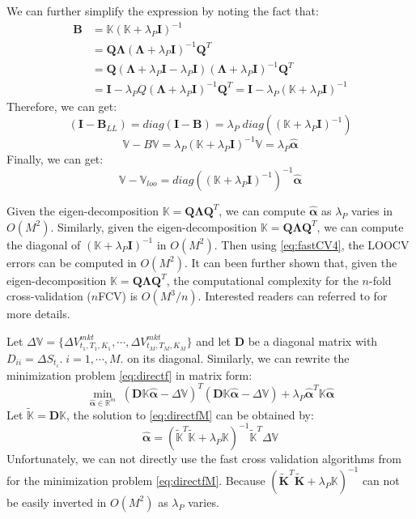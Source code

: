 \documentclass[letterpaper,12pt,titlepage,oneside,final]{book}
\numberwithin{equation}{section}
\theoremstyle{definition}
\newcommand{\Real}{\mathbb{R}}
\newcommand{\valpha}{\pmb{\widehat{\alpha}}}
\newcommand{\vK}{\mathbb{K}}
\newcommand{\Vmkt}{V^{mkt}}
\newcommand{\vecVmkt}{\mathbb{V}}
\begin{document}
We can further simplify the expression by noting the fact that:
\[\begin{split}
\pmb{B}&=\vK (\vK+\lambda_P \pmb{I})^{-1} \\
       &=\pmb{Q}\pmb{\Lambda}(\pmb{\Lambda}+\lambda_P \pmb{I})^{-1} \pmb{Q}^T\\
       &=\pmb{Q}(\pmb{\Lambda}+\lambda_P \pmb{I}-\lambda_P \pmb{I})(\pmb{\Lambda}+\lambda_P \pmb{I})^{-1} \pmb{Q}^T\\
       &= \pmb{I}-\lambda_P Q (\pmb{\Lambda}+\lambda_P \pmb{I})^{-1} \pmb{Q}^T=\pmb{I} -\lambda_P  (\vK+\lambda_P \pmb{I})^{-1}
  \end{split}
\]
Therefore, we can get:
\[
(\pmb{I}-\pmb{B}_{LL})=diag(\pmb{I}-\pmb{B})=\lambda_P \; diag((\vK+\lambda_P \pmb{I})^{-1})
\]
\[
\vecVmkt-B\vecVmkt=\lambda_P (\vK+\lambda_P \pmb{I})^{-1} \vecVmkt =\lambda_P \valpha
\]
Finally, we can get:
\begin{equation}  \label{eq:fastCV4}
\vecVmkt-\vecVmkt_{loo}=diag((\vK+\lambda_P \pmb{I})^{-1})^{-1} \valpha
\end{equation}

Given the eigen-decomposition $\vK=\pmb{Q} \pmb{\Lambda} \pmb{Q}^T$, we can compute  $\valpha$ as $\lambda_P$ varies in $O(M^2)$. Similarly, given the eigen-decomposition $\vK=\pmb{Q} \pmb{\Lambda} \pmb{Q}^T$, we can compute the diagonal of $(\vK+\lambda_P \pmb{I})^{-1}$ in $O(M^2)$. Then  using \eqref{eq:fastCV4}, the LOOCV errors can be computed in $O(M^2)$.  It can been further shown \cite{pahikkala2006fast} that, given the eigen-decomposition $\vK=\pmb{Q} \pmb{\Lambda} \pmb{Q}^T$, the computational complexity for the $n$-fold cross-validation ($n$FCV) is $O(M^3/n)$. Interested readers can referred to \citep{pahikkala2006fast, wahba1990spline} for more details.

Let $\Delta \vecVmkt=\{\Delta \Vmkt_{t_1,T_1,K_1},\cdots,\Delta \Vmkt_{t_M,T_M,K_M}\}$ and  let $\pmb{D}$ be a diagonal matrix with $D_{ii}=\Delta S_{t_i}. \;i=1,\cdots,M.$ on its diagonal.
Similarly, we can rewrite  the minimization problem \eqref{eq:directf} in matrix form:
\begin{equation}
\min_{\valpha \in \Real^m} \; ( \pmb{D} \vK \valpha - \Delta \vecVmkt)^T (\pmb{D}  \vK \valpha -\Delta \vecVmkt)+ \lambda_P \valpha^T\vK\valpha
\label{eq:directfM}
\end{equation}
Let $\widetilde{\vK}=\pmb{D}\vK$, the solution to \eqref{eq:directfM} can be obtained by:
\[
\valpha = (\widetilde{\vK}^T\widetilde{\vK}  + \lambda_P \vK)^{-1} \widetilde{\vK}^T \Delta \vecVmkt
\]
Unfortunately, we can not directly use the fast cross validation algorithms from \cite{pahikkala2006fast, wahba1990spline} for the minimization problem \eqref{eq:directfM}.
Because $(\pmb{\widetilde{K}}^T\pmb{\widetilde{K}}  + \lambda_P \vK)^{-1}$ can not be easily inverted in $O(M^2)$ as $\lambda_P$ varies.
\end{document}
